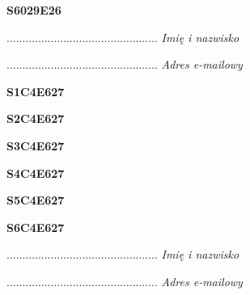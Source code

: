 \begin{turn}{90}\huge \textbf{S6029E26}\end{turn}

\begin{turn}{90}\begin{minipage}{\linewidth} \vspace{20mm} ................................................  \textit{Imię i nazwisko}\end{minipage}\end{turn}

\begin{turn}{90}\begin{minipage}{\linewidth} \vspace{20mm} ................................................  \textit{Adres e-mailowy}\end{minipage}\end{turn}

\begin{turn}{90}\huge \textbf{S1C4E627}\end{turn}

\begin{turn}{90}\huge \textbf{S2C4E627}\end{turn}

\begin{turn}{90}\huge \textbf{S3C4E627}\end{turn}

\begin{turn}{90}\huge \textbf{S4C4E627}\end{turn}

\begin{turn}{90}\huge \textbf{S5C4E627}\end{turn}

\begin{turn}{90}\huge \textbf{S6C4E627}\end{turn}

\begin{turn}{90}\begin{minipage}{\linewidth} \vspace{20mm} ................................................  \textit{Imię i nazwisko}\end{minipage}\end{turn}

\begin{turn}{90}\begin{minipage}{\linewidth} \vspace{20mm} ................................................  \textit{Adres e-mailowy}\end{minipage}\end{turn}

